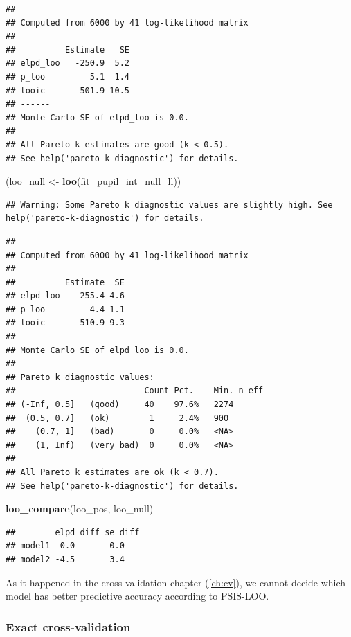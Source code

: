 \documentclass[12pt,]{krantz}
\newenvironment{Shaded}{\begin{snugshade}}{\end{snugshade}}
\newcommand{\KeywordTok}[1]{\textcolor[rgb]{0.13,0.29,0.53}{\textbf{#1}}}
\newcommand{\NormalTok}[1]{#1}
\newcommand{\StringTok}[1]{\textcolor[rgb]{0.31,0.60,0.02}{#1}}
\theoremstyle{definition}
\theoremstyle{definition}
\theoremstyle{definition}
\theoremstyle{remark}
\begin{document}
\begin{verbatim}
## 
## Computed from 6000 by 41 log-likelihood matrix
## 
##          Estimate   SE
## elpd_loo   -250.9  5.2
## p_loo         5.1  1.4
## looic       501.9 10.5
## ------
## Monte Carlo SE of elpd_loo is 0.0.
## 
## All Pareto k estimates are good (k < 0.5).
## See help('pareto-k-diagnostic') for details.
\end{verbatim}

\begin{Shaded}
\begin{Highlighting}[]
\NormalTok{(loo_null <-}\StringTok{ }\KeywordTok{loo}\NormalTok{(fit_pupil_int_null_ll))}
\end{Highlighting}
\end{Shaded}

\begin{verbatim}
## Warning: Some Pareto k diagnostic values are slightly high. See help('pareto-k-diagnostic') for details.
\end{verbatim}

\begin{verbatim}
## 
## Computed from 6000 by 41 log-likelihood matrix
## 
##          Estimate  SE
## elpd_loo   -255.4 4.6
## p_loo         4.4 1.1
## looic       510.9 9.3
## ------
## Monte Carlo SE of elpd_loo is 0.0.
## 
## Pareto k diagnostic values:
##                          Count Pct.    Min. n_eff
## (-Inf, 0.5]   (good)     40    97.6%   2274      
##  (0.5, 0.7]   (ok)        1     2.4%   900       
##    (0.7, 1]   (bad)       0     0.0%   <NA>      
##    (1, Inf)   (very bad)  0     0.0%   <NA>      
## 
## All Pareto k estimates are ok (k < 0.7).
## See help('pareto-k-diagnostic') for details.
\end{verbatim}

\begin{Shaded}
\begin{Highlighting}[]
\KeywordTok{loo_compare}\NormalTok{(loo_pos, loo_null)}
\end{Highlighting}
\end{Shaded}

\begin{verbatim}
##        elpd_diff se_diff
## model1  0.0       0.0   
## model2 -4.5       3.4
\end{verbatim}

As it happened in the cross validation chapter (\ref{ch:cv}), we cannot decide which model has better predictive accuracy according to PSIS-LOO.

\hypertarget{exact-cross-validation}{%
\subsubsection{Exact cross-validation}\label{exact-cross-validation}}
\end{document}

